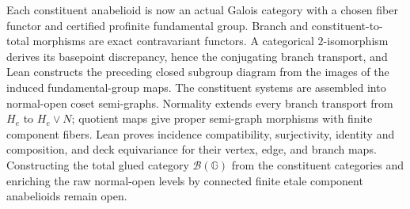 \begin{definition}
  Each constituent anabelioid is now an actual Galois category with a chosen
  fiber functor and certified profinite fundamental group.  Branch and
  constituent-to-total morphisms are exact contravariant functors.  A
  categorical $2$-isomorphism derives its basepoint discrepancy, hence the
  conjugating branch transport, and Lean constructs the preceding closed
  subgroup diagram from the images of the induced fundamental-group maps.
  The constituent systems are assembled into normal-open coset semi-graphs.
  Normality extends every branch transport from $H_e$ to $H_e\vee N$; quotient
  maps give proper semi-graph morphisms with finite component fibers.  Lean
  proves incidence compatibility, surjectivity, identity and composition, and
  deck equivariance for their vertex, edge, and branch maps.  Constructing the
  total glued category $\mathcal B(\mathbb G)$ from the constituent categories
  and enriching the raw normal-open levels by connected finite etale
  component anabelioids remain open.


\end{definition}
